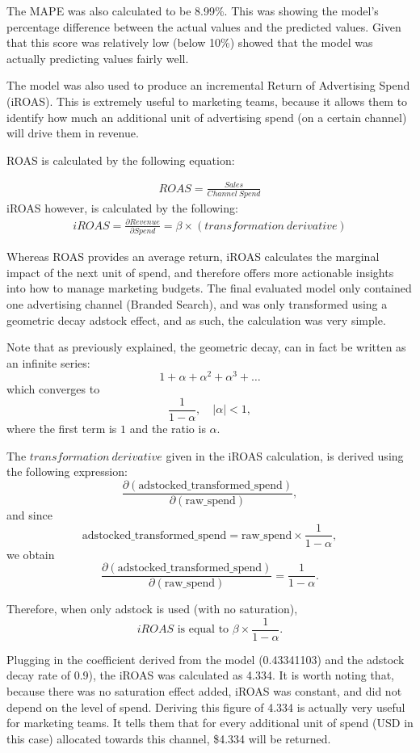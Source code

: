 \documentclass[11pt, a4paper]{article}
\begin{document}
 The MAPE was also calculated to be 8.99\%. This was showing the model's percentage difference between the actual values and the predicted values. Given that this score was relatively low (below 10\%) showed that the model was actually predicting values fairly well.  

The model was also used to produce an incremental Return of Advertising Spend (iROAS). This is extremely useful to marketing teams, because it allows them to identify how much an additional unit of advertising spend (on a certain channel) will drive them in revenue. 

ROAS is calculated by the following equation:

\begin{gather*}
ROAS = \frac{Sales}{Channel\ Spend}
\end{gather*}
iROAS however, is calculated by the following:
\begin{gather*}
iROAS =\frac{\partial Revenue}{\partial Spend} = \beta \times (transformation \ derivative)
\end{gather*}

Whereas ROAS provides an average return, iROAS calculates the marginal impact of the next unit of spend, and therefore offers more actionable insights into how to manage marketing budgets. The final evaluated model only contained one advertising channel (Branded Search), and was only transformed using a geometric decay adstock effect, and as such, the calculation was very simple. 

Note that as previously explained, the geometric decay, can in fact be written as an infinite series: 
\[
1 + \alpha + \alpha^2 + \alpha^3 + \dots
\]
which converges to
\[
\frac{1}{1-\alpha}, \quad |\alpha| < 1,
\]
where the first term is $1$ and the ratio is $\alpha$.

The $transformation \ derivative$ given in the iROAS calculation, is derived using the following expression:
\[
\frac{\partial(\text{adstocked\_transformed\_spend})}{\partial(\text{raw\_spend})},
\]
and since
\[
\text{adstocked\_transformed\_spend} = \text{raw\_spend} \times \frac{1}{1-\alpha},
\]
we obtain
\[
\frac{\partial(\text{adstocked\_transformed\_spend})}{\partial(\text{raw\_spend})} = \frac{1}{1-\alpha}.
\]

Therefore, when only adstock is used (with no saturation),
\[
iROAS \text{ is equal to } \beta \times \frac{1}{1-\alpha}.
\]

Plugging in the coefficient derived from the model (0.43341103) and the adstock decay rate of 0.9), the iROAS was calculated as 4.334. It is worth noting that, because there was no saturation effect added, iROAS was constant, and did not depend on the level of spend. Deriving this figure of 4.334 is actually very useful for marketing teams. It tells them that for every additional unit of spend (USD in this case) allocated towards this channel, \$4.334 will be returned. 
\end{document}
